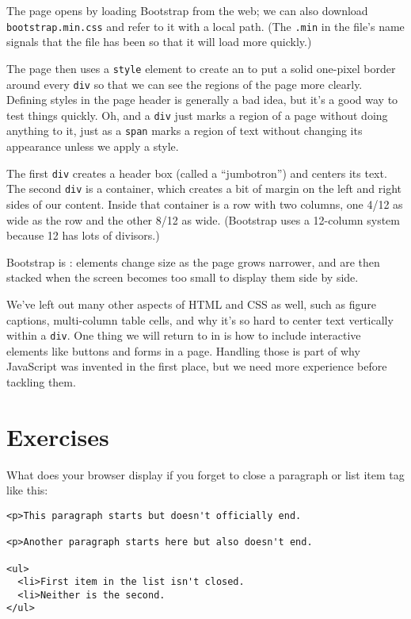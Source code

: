 The page opens by loading Bootstrap from the web;
we can also download \texttt{bootstrap.min.css} and refer to it with a local path.
(The \texttt{.min} in the file's name signals that the file has been 
so that it will load more quickly.)

The page then uses a \texttt{style} element to create an 
to put a solid one-pixel border around every \texttt{div}
so that we can see the regions of the page more clearly.
Defining styles in the page header is generally a bad idea,
but it's a good way to test things quickly.
Oh,
and a \texttt{div} just marks a region of a page without doing anything to it,
just as a \texttt{span} marks a region of text without changing its appearance
unless we apply a style.

The first \texttt{div} creates a header box (called a ``jumbotron'') and centers its text.
The second \texttt{div} is a container,
which creates a bit of margin on the left and right sides of our content.
Inside that container is a row with two columns,
one 4/12 as wide as the row and the other 8/12 as wide.
(Bootstrap uses a 12-column system because 12 has lots of divisors.)

Bootstrap is :
elements change size as the page grows narrower,
and are then stacked when the screen becomes too small to display them side by side.

We've left out many other aspects of HTML and CSS as well,
such as figure captions,
multi-column table cells,
and why it's so hard to center text vertically within a \texttt{div}.
One thing we will return to in  is
how to include interactive elements like buttons and forms in a page.
Handling those is part of why JavaScript was invented in the first place,
but we need more experience before tackling them.

\section{Exercises}\label{s:htmlcss-exercises}


What does your browser display if you forget to close a paragraph or list item tag
like this:

\begin{verbatim}
<p>This paragraph starts but doesn't officially end.

<p>Another paragraph starts here but also doesn't end.

<ul>
  <li>First item in the list isn't closed.
  <li>Neither is the second.
</ul>
\end{verbatim}

